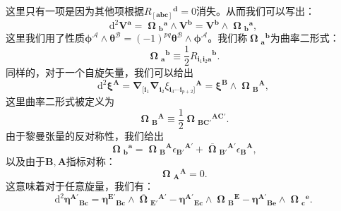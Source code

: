 这里只有一项是因为其他项根据$R{_{[\boldsymbol{abc}]}}^{\boldsymbol{d}} =0$消失。从而我们可以写出：
\begin{equation*}
	\mathrm{d}^{2}\boldsymbol{V}^{\boldsymbol{a}} =\boldsymbol{\upOmega}{_{\boldsymbol{b}}}^{\boldsymbol{a}} \land \boldsymbol{V}^{\boldsymbol{b}} =\boldsymbol{V}^{\boldsymbol{b}} \land \boldsymbol{\upOmega}{_{\boldsymbol{b}}}^{\boldsymbol{a}} ,
\end{equation*}
这里我们用了性质$\boldsymbol{\phi}^{\mathcal{A}} \land \boldsymbol{\theta}^{\mathcal{B}} =( -1)^{pq}\boldsymbol{\theta}^{\mathcal{B}} \land \boldsymbol{\phi}^{\mathcal{A}}$。我们称$\boldsymbol{\upOmega}{_{\boldsymbol{a}}}^{\boldsymbol{b}}$为曲率二形式：
\begin{equation*}
	\boldsymbol{\upOmega}{_{\boldsymbol{a}}}^{\boldsymbol{b}} \equiv \frac{1}{2} R{_{\boldsymbol{i}_{1}\boldsymbol{i}_{2}\boldsymbol{a}}}^{\boldsymbol{b}} .
\end{equation*}
同样的，对于一个自旋矢量，我们可以给出
\begin{equation*}
	\mathrm{d}^{2}\boldsymbol{\xi}^{\boldsymbol{A}} =\boldsymbol{\nabla }_{[\boldsymbol{i}_{1}}\boldsymbol{\nabla }_{\boldsymbol{i}_{2}} \xi {_{\boldsymbol{i}_{3} \cdots \boldsymbol{i}_{p+2}]}}^{\boldsymbol{A}} =\boldsymbol{\xi}^{\boldsymbol{B}} \land \boldsymbol{\upOmega}{_{\boldsymbol{B}}}^{\boldsymbol{A}} ,
\end{equation*}
这里曲率二形式被定义为
\begin{equation*}
	\boldsymbol{\upOmega}{_{\boldsymbol{B}}}^{\boldsymbol{A}} \equiv \frac{1}{2}\boldsymbol{\upOmega}{_{\boldsymbol{BC} '}}^{\boldsymbol{AC} '} .
\end{equation*}
由于黎曼张量的反对称性，我们给出
\begin{equation*}
	\boldsymbol{\upOmega}{_{\boldsymbol{b}}}^{\boldsymbol{a}} =\boldsymbol{\upOmega}{_{\boldsymbol{B}}}^{\boldsymbol{A}} \epsilon {_{\boldsymbol{B} '}}^{\boldsymbol{A} '} +\overline{\boldsymbol{\upOmega}}{_{\boldsymbol{B} '}}^{\boldsymbol{A} '} \epsilon {_{\boldsymbol{B}}}^{\boldsymbol{A}} ,
\end{equation*}
以及由于$\boldsymbol{B} ,\boldsymbol{A}$指标对称：
\begin{equation*}
	\boldsymbol{\upOmega}{_{\boldsymbol{A}}}^{\boldsymbol{A}} =0.
\end{equation*}
这意味着对于任意旋量，我们有：
\begin{equation*}
	\mathrm{d}^{2}\boldsymbol{\eta}^{\boldsymbol{A} '}{}_{\boldsymbol{Bc}} =\boldsymbol{\eta}^{\boldsymbol{E} '}{}_{\boldsymbol{Bc}} \land \overline{\boldsymbol{\upOmega}}{_{\boldsymbol{E} '}}^{\boldsymbol{A} '} -\boldsymbol{\eta}^{\boldsymbol{A} '}{}_{\boldsymbol{Ec}} \land \boldsymbol{\upOmega}{_{\boldsymbol{B}}}^{\boldsymbol{E}} -\boldsymbol{\eta}^{\boldsymbol{A} '}{}_{\boldsymbol{Be}} \land \boldsymbol{\upOmega}{_{\boldsymbol{c}}}^{\boldsymbol{e}} .
\end{equation*}
